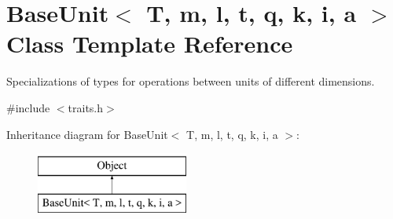 \hypertarget{classBaseUnit}{}\section{Base\+Unit$<$ T, m, l, t, q, k, i, a $>$ Class Template Reference}
\label{classBaseUnit}


Specializations of types for operations between units of different dimensions.  




{\ttfamily \#include $<$traits.\+h$>$}

Inheritance diagram for Base\+Unit$<$ T, m, l, t, q, k, i, a $>$\+:\begin{figure}[H]
\begin{center}
\leavevmode
\includegraphics[height=2.000000cm]{classBaseUnit}
\end{center}
\end{figure}
